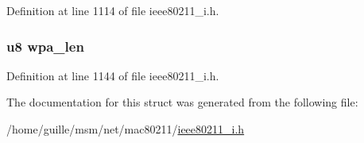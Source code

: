 Definition at line 1114 of file ieee80211\-\_\-i.\-h.

\hypertarget{structieee802__11__elems_a46f04df3a13e3b941f3250516466e8ba}{
\subsubsection[{wpa\-\_\-len}]{\setlength{\rightskip}{0pt plus 5cm}u8 wpa\-\_\-len}}\label{structieee802__11__elems_a46f04df3a13e3b941f3250516466e8ba}


Definition at line 1144 of file ieee80211\-\_\-i.\-h.



The documentation for this struct was generated from the following file\-:\begin{DoxyCompactItemize}
\item 
/home/guille/msm/net/mac80211/\hyperlink{ieee80211__i_8h}{ieee80211\-\_\-i.\-h}\end{DoxyCompactItemize}
